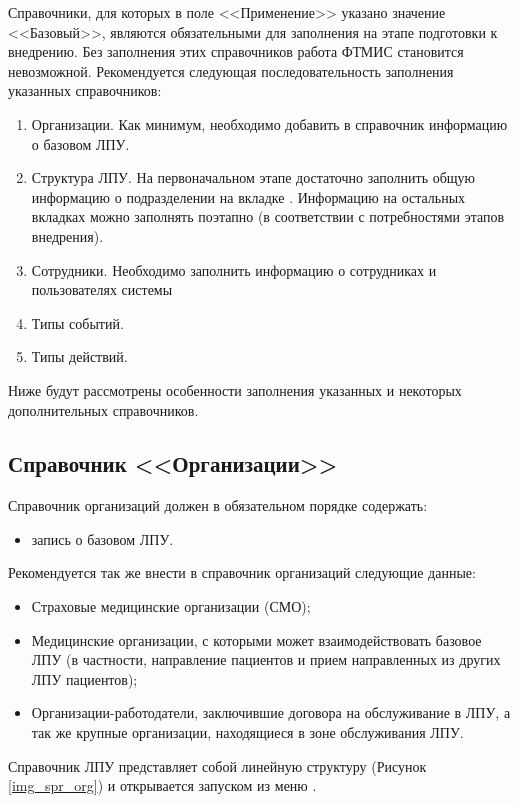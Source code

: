 Справочники, для которых в поле <<Применение>> указано значение <<Базовый>>, являются обязательными для заполнения на этапе подготовки к внедрению. Без заполнения этих справочников работа ФТМИС становится невозможной. Рекомендуется следующая последовательность заполнения указанных справочников:
\begin{enumerate}
 \item Организации. Как минимум, необходимо добавить в справочник информацию о базовом ЛПУ.
 \item Структура ЛПУ. На первоначальном этапе достаточно заполнить общую информацию о подразделении на вкладке . Информацию на остальных вкладках можно заполнять поэтапно (в соответствии с потребностями этапов внедрения).
 \item Сотрудники. Необходимо заполнить информацию о сотрудниках и пользователях системы
 \item Типы событий.
 \item Типы действий.
\end{enumerate}
 
Ниже будут рассмотрены особенности заполнения указанных и некоторых дополнительных справочников.

\subsection{Справочник <<Организации>>}

Справочник организаций должен в обязательном порядке содержать:
\begin{itemize}
 \item 	запись о базовом ЛПУ.
\end{itemize}

Рекомендуется так же внести в справочник организаций следующие данные:
\begin{itemize}
 \item Страховые медицинские организации (СМО);
 \item Медицинские организации, с которыми может взаимодействовать базовое ЛПУ (в частности, направление пациентов и прием направленных из других ЛПУ пациентов);
 \item Организации-работодатели, заключившие договора на обслуживание в ЛПУ, а так же крупные организации, находящиеся в зоне обслуживания ЛПУ.
\end{itemize}

Справочник ЛПУ представляет собой линейную структуру (Рисунок \ref{img_spr_org}) и открывается запуском из меню .
 
